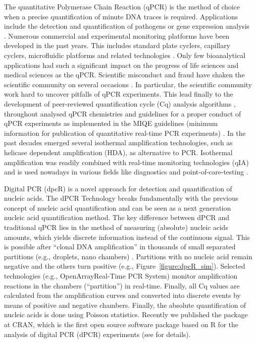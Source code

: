 The quantitative Polymerase Chain Reaction (qPCR) is the method of choice when a 
precise quantification of minute DNA traces is required. Applications include 
the detection and quantification of pathogens or gene expression analysis 
\citep{peirson_2003}. Numerous commercial and experimental monitoring platforms 
have been developed in the past years. This includes standard plate cyclers, 
capillary cyclers, microfluidic platforms and related technologies 
\citep{rodiger_highly_2013, devonshire_2013, viturro_2014, rodiger_nucleic_2014, 
khodakov_2014, wu_2014}. Only few bioanalytical applications had such a 
significant impact on the progress of life sciences and medical sciences as the 
qPCR. Scientific misconduct and fraud have shaken the scientific community on 
several occasions \citep{fang_2012}. In particular, the scientific community 
work hard to uncover pitfalls of qPCR experiments. This lead finally to the 
development of peer-reviewed quantification cycle (Cq) analysis algorithms 
\citep{ruijter_2013}, throughout analysed qPCR chemistries \citep{ruijter_2014} 
and guidelines for a proper conduct of qPCR experiments as implemented in the 
MIQE guidelines (minimum information for publication of quantitative real-time 
PCR experiments) \citep{bustin_miqe_2009, huggett_2013}. In the past decades 
emerged several isothermal amplification technologies, such as helicase 
dependent amplification (HDA), as alternative to PCR. Isothermal amplification 
was readily combined with real-time monitoring technologies (qIA) and is used 
nowadays in various fields like diagnostics and point-of-care-testing 
\citep{rodiger_nucleic_2014}.

Digital PCR (dpcR) is a novel approach for detection and quantification of 
nucleic acids. The dPCR Technology breaks fundamentally with the previous 
concept of nucleic acid quantification and can be seen as a next generation 
nucleic acid quantification method. The key difference between dPCR and 
traditional qPCR lies in the method of measuring (absolute) nucleic acids 
amounts, which yields discrete information instead of the continuous signal. 
This is possible after ``clonal DNA amplification'' in thousands of small 
separated partitions (e.g., droplets, nano chambers) \citep{huggett_2013, 
milbury_2014, morley_2014}. Partitions with no nucleic acid remain negative and 
the others turn positive (e.g., Figure~\ref{figure:dpcR_sim}). Selected 
technologies (e.g., OpenArray\textregistered Real-Time PCR System) monitor 
amplification reactions in the chambers (``partition'') in real-time. Finally, 
all Cq values are calculated from the amplification curves and converted into 
discrete events by means of positive and negative chambers. Finally, the 
absolute quantification of nucleic acids is done using Poisson statistics. 
Recently we published the  package at CRAN, which is the first 
open source software package based on R for the analysis of digital PCR (dPCR) 
experiments (see  for details).


